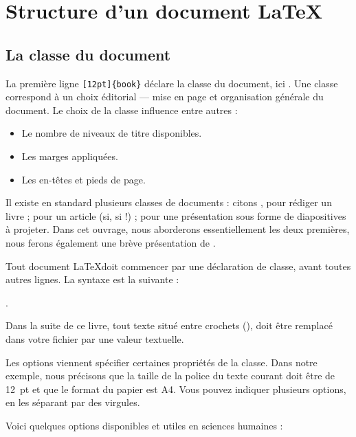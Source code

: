 \section{Structure d'un document \LaTeX}

\subsection{La classe du document}
La première ligne \verb|[12pt]{book}| déclare la classe du document, ici . Une classe correspond à un choix éditorial    --- mise en page et organisation générale du document. Le choix de la classe influence entre autres :
\begin{itemize}
\item Le nombre de niveaux de titre disponibles.
\item Les marges appliquées.
\item Les en-têtes et pieds de page.
\end{itemize}

Il existe en standard plusieurs classes de documents : citons , pour rédiger un livre ;  pour un article (si, si !) ;  pour une présentation sous forme de diapositives à projeter. Dans cet ouvrage, nous aborderons essentiellement les deux premières, nous ferons également une brève présentation de .



Tout document \LaTeX doit commencer par une déclaration de classe, avant toutes autres lignes.
La syntaxe est la suivante : 

.

\begin{attention}
Dans la suite de ce livre, tout texte situé entre crochets (), doit être remplacé dans votre fichier  par une valeur textuelle.
\end{attention}

Les options viennent spécifier certaines propriétés de la classe. Dans notre exemple, nous précisons que la taille de la police du texte courant doit être de 12~pt et que le format du papier est A4. Vous pouvez indiquer plusieurs options, en les séparant par des virgules. \label{optionsclasse}

Voici quelques options disponibles et utiles en sciences humaines :

